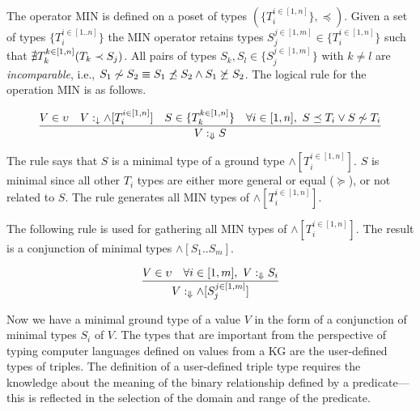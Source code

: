 \documentclass[runningheads]{llncs}
\newcommand{\darr}{\downarrow}
\newcommand{\Darr}{\Downarrow}
\newcommand{\vdasharr}{%
    \mathrel{%
        \vdash\hspace*{-5pt}%
        \raisebox{2.3pt}{\scalebox{.5}{\(\blacktriangleright\)}}%
    }%
}\newcommand{\D}{{\Delta}}
\newcommand{\memo}[1]{}
\begin{document}
The operator MIN is defined on a poset of types
$(\{T_i^{i\in[1,n]}\},\preceq)$. Given a set of types $\{T_i^{i\in[1..n]}\}$
the MIN operator retains types $S_j^{j\in[1,m]}\in\{T_i^{i\in[1,n]}\}$
such that ${\nexists}\/T_k^{k\in[1,n]}(T_k\prec\/S_j)$. All pairs of
types $S_k,S_l\in\{S_j^{j\in[1,m]}\}$ with $k\not=l$ are
\emph{incomparable}, i.e.,
$S_1\not\sim\/S_2\equiv\/S_1\not\preceq\/S_2\land\/S_1\not\succeq\/S_2$.
The logical rule for the operation MIN is as follows.

\begin{equation}
\label{rul:min}
\dfrac{V\in\upsilon\quad\/V:_\darr\land[T_i^{i\in[1,n]}]\quad\/S\in\/\{T_k^{k\in[1,n]}\}\quad\forall\/i\in[1,n],\ S\preceq\/T_i\lor\/S\not\sim\/T_i}
      {V:_{\Darr}S}
\end{equation}

The rule says that $S$ is a minimal type of a ground type
$\land[T_i^{i\in[1,n]}]$. $S$ is minimal since all other $T_i$ types are
either more general or equal ($\succeq$), or not related to $S$. The
rule generates all MIN types of $\land[T_i^{i\in[1,n]}]$.

The following rule is used for gathering all MIN types of
$\land[T_i^{i\in[1,n]}]$. The result is a conjunction of minimal types
$\land[S_1..S_m]$.

\begin{equation}
\label{rul:min-gather}
\dfrac{V\in\upsilon\quad\forall\/i\in[1,m],\ V:_\Darr\/S_i}
      {V:_{\Darr}\land[S_j^{j\in[1,m]}]}
\end{equation}


\memo{
The rule for filtering $\land[T_i^{i\in[1,n]}]$ of all
$T_i\succeq\/T_j$ where $i\not=j$ by using algorithmic typing is
defined as follows. The algorithm implementing the operation MIN is
presented in Section \ref{sec:alg-MIN}.

\begin{equation}
\label{rul:alg-min}
\dfrac{V\in\upsilon\quad\vdasharr\/V:_\darr\land[T_i^{i\in[1,n]}]\quad\vdasharr\/\{S_j^{j\in[1,m}\}=\,\Darr\kern -3pt[T_i^{i\in[1,n]}]}
{\vdasharr\/V:_{\Darr}\land\/[S_j^{j\in[1,m]}]}
\end{equation}}


Now we have a minimal ground type of a value $V$ in the form of a
conjunction of minimal types $S_i$ of $V$. The types that are
important from the perspective of typing computer languages defined on
values from a KG are the user-defined types of triples. The definition
of a user-defined triple type requires the knowledge about the meaning
of the binary relationship defined by a predicate---this is reflected
in the selection of the domain and range of the predicate.
\end{document}

